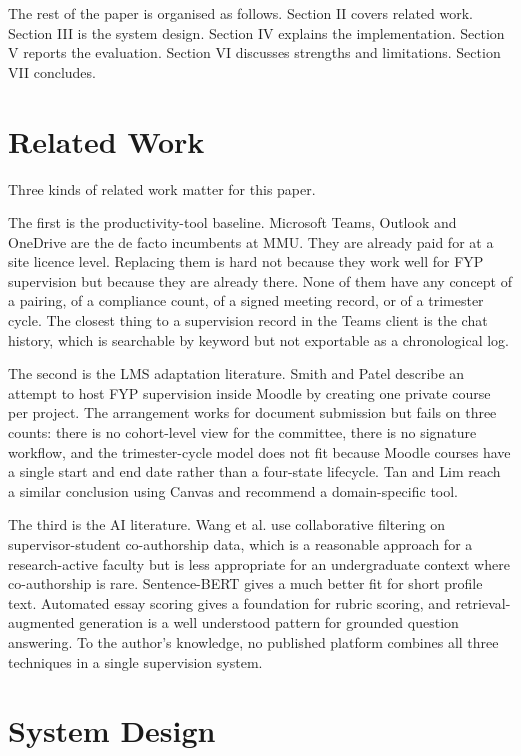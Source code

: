 \documentclass[conference,a4paper]{IEEEtran}
\begin{document}
The rest of the paper is organised as follows. Section II covers related work. Section III is the system design. Section IV explains the implementation. Section V reports the evaluation. Section VI discusses strengths and limitations. Section VII concludes.

\section{Related Work}
Three kinds of related work matter for this paper.

The first is the productivity-tool baseline. Microsoft Teams, Outlook and OneDrive are the de facto incumbents at MMU. They are already paid for at a site licence level. Replacing them is hard not because they work well for FYP supervision but because they are already there. None of them have any concept of a pairing, of a compliance count, of a signed meeting record, or of a trimester cycle. The closest thing to a supervision record in the Teams client is the chat history, which is searchable by keyword but not exportable as a chronological log.

The second is the LMS adaptation literature. Smith and Patel \cite{smith2021} describe an attempt to host FYP supervision inside Moodle by creating one private course per project. The arrangement works for document submission but fails on three counts: there is no cohort-level view for the committee, there is no signature workflow, and the trimester-cycle model does not fit because Moodle courses have a single start and end date rather than a four-state lifecycle. Tan and Lim \cite{tan2022} reach a similar conclusion using Canvas and recommend a domain-specific tool.

The third is the AI literature. Wang et al. \cite{wang2018} use collaborative filtering on supervisor-student co-authorship data, which is a reasonable approach for a research-active faculty but is less appropriate for an undergraduate context where co-authorship is rare. Sentence-BERT \cite{reimers2019} gives a much better fit for short profile text. Automated essay scoring \cite{ramesh2022} gives a foundation for rubric scoring, and retrieval-augmented generation \cite{lewis2020} is a well understood pattern for grounded question answering. To the author's knowledge, no published platform combines all three techniques in a single supervision system.

\section{System Design}
\end{document}
